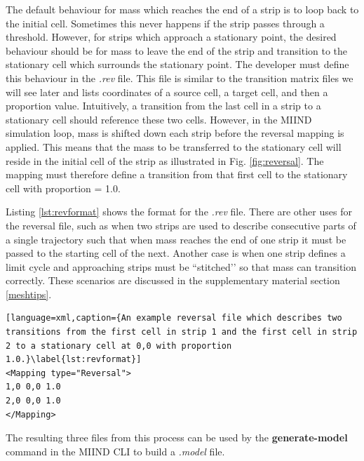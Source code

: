 \documentclass[utf8]{frontiers_suppmat} %
\begin{document}
The default behaviour for mass which reaches the end of a strip is to loop back to the initial cell. Sometimes this never happens if the strip passes through a threshold. However, for strips which approach a stationary point, the desired behaviour should be for mass to leave the end of the strip and transition to the stationary cell which surrounds the stationary point. The developer must define this behaviour in the \textit{.rev} file. This file is similar to the transition matrix files we will see later and lists coordinates of a source cell, a target cell, and then a proportion value. Intuitively, a transition from the last cell in a strip to a stationary cell should reference these two cells. However, in the MIIND simulation loop, mass is shifted down each strip before the reversal mapping is applied. This means that the mass to be transferred to the stationary cell will reside in the initial cell of the strip as illustrated in Fig. \ref{fig:reversal}. The mapping must therefore define a transition from that first cell to the stationary cell with proportion = 1.0.

Listing \ref{lst:revformat} shows the format for the \textit{.rev} file. There are other uses for the reversal file, such as when two strips are used to describe consecutive parts of a single trajectory such that when mass reaches the end of one strip it must be passed to the starting cell of the next. Another case is when one strip defines a limit cycle and approaching strips must be ``stitched’’ so that mass can transition correctly. These scenarios are discussed in the supplementary material section \ref{meshtips}.

\begin{lstlisting}[language=xml,caption={An example reversal file which describes two transitions from the first cell in strip 1 and the first cell in strip 2 to a stationary cell at 0,0 with proportion 1.0.}\label{lst:revformat}]
<Mapping type="Reversal">
1,0	0,0	1.0
2,0	0,0	1.0
</Mapping>
\end{lstlisting}

The resulting three files from this process can be used by the \textbf{generate-model} command in the MIIND CLI to build a \textit{.model} file.\\
\end{document}
